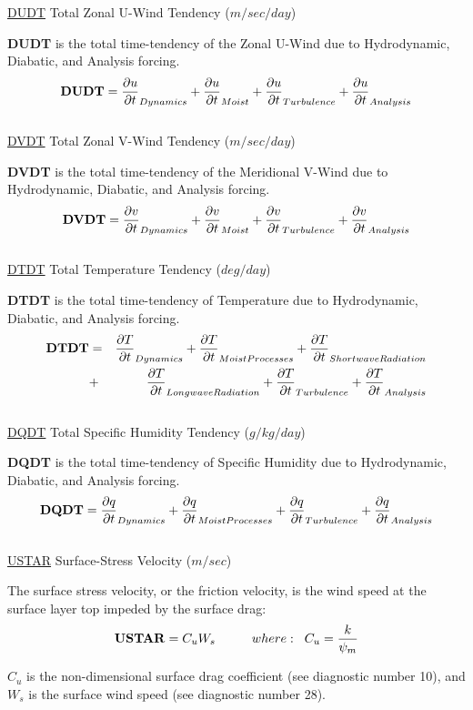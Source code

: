 \noindent
{ \underline {DUDT} Total Zonal U-Wind Tendency  ($m/sec/day$) }

\noindent
{\bf DUDT} is the total time-tendency of the Zonal U-Wind due to Hydrodynamic, Diabatic,
and Analysis forcing.
\[
{\bf DUDT} = \frac{\partial u}{\partial t}_{Dynamics} + \frac{\partial u}{\partial t}_{Moist} + \frac{\partial u}{\partial t}_{Turbulence} + \frac{\partial u}{\partial t}_{Analysis} 
\]
\\

\noindent
{ \underline {DVDT} Total Zonal V-Wind Tendency  ($m/sec/day$) }

\noindent
{\bf DVDT} is the total time-tendency of the Meridional V-Wind due to Hydrodynamic, Diabatic,
and Analysis forcing.
\[
{\bf DVDT} = \frac{\partial v}{\partial t}_{Dynamics} + \frac{\partial v}{\partial t}_{Moist} + \frac{\partial v}{\partial t}_{Turbulence} + \frac{\partial v}{\partial t}_{Analysis} 
\]
\\

\noindent
{ \underline {DTDT} Total Temperature Tendency  ($deg/day$) }

\noindent
{\bf DTDT} is the total time-tendency of Temperature due to Hydrodynamic, Diabatic,
and Analysis forcing.
\begin{eqnarray*}
{\bf DTDT} & = & \pp{T}{t}_{Dynamics} + \pp{T}{t}_{Moist Processes} + \pp{T}{t}_{Shortwave Radiation} \\
           & + & \pp{T}{t}_{Longwave Radiation} + \pp{T}{t}_{Turbulence} + \pp{T}{t}_{Analysis} 
\end{eqnarray*}
\\

\noindent
{ \underline {DQDT} Total Specific Humidity Tendency  ($g/kg/day$) }

\noindent
{\bf DQDT} is the total time-tendency of Specific Humidity due to Hydrodynamic, Diabatic,
and Analysis forcing.
\[
{\bf DQDT} = \frac{\partial q}{\partial t}_{Dynamics} + \frac{\partial q}{\partial t}_{Moist Processes} 
+ \frac{\partial q}{\partial t}_{Turbulence} + \frac{\partial q}{\partial t}_{Analysis} 
\]
\\
   
\noindent
{ \underline {USTAR}  Surface-Stress Velocity ($m/sec$) }

\noindent
The surface stress velocity, or the friction velocity, is the wind speed at 
the surface layer top impeded by the surface drag:
\[
{\bf USTAR} = C_uW_s \hspace{1cm}where: \hspace{.2cm} 
C_u = \frac{k}{\psi_m}
\]

\noindent
$C_u$ is the non-dimensional surface drag coefficient (see diagnostic
number 10), and $W_s$ is the surface wind speed (see diagnostic number 28).
 
